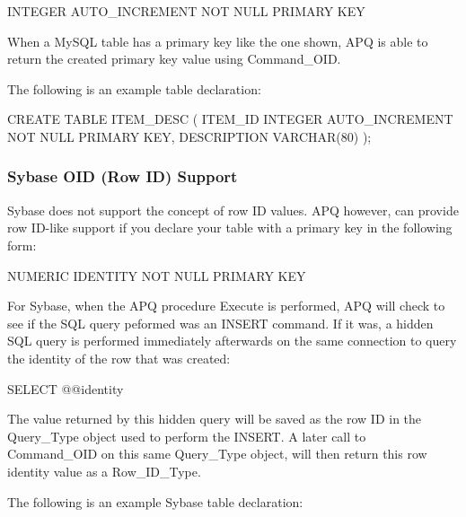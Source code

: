 \documentclass[english,letterpaper]{book}
\begin{document}
\begin{SQL}

   INTEGER AUTO_INCREMENT NOT NULL PRIMARY KEY

\end{SQL}

When a MySQL table has a primary key like the one shown, APQ is able
to return the created primary key value using Command\_OID. 

The following is an example table declaration:

\begin{SQL}
CREATE TABLE ITEM_DESC (
   ITEM_ID     INTEGER AUTO_INCREMENT NOT NULL PRIMARY KEY,
   DESCRIPTION VARCHAR(80)
);
\end{SQL}

\subsubsection{Sybase OID (Row ID) Support}

Sybase does not support the concept of row ID values. APQ however,
can provide row ID-like support if you declare your table with a primary
key in the following form:

\begin{SQL}

   NUMERIC IDENTITY NOT NULL PRIMARY KEY

\end{SQL}

For Sybase, when the APQ procedure Execute is performed, APQ will
check to see if the SQL query peformed was an INSERT command. If it
was, a hidden SQL query is performed immediately afterwards on the
same connection to query the identity of the row that was created:

\begin{SQL}

   SELECT @@identity

\end{SQL}

The value returned by this hidden query will be saved as the row ID
in the Query\-\_Type object used to perform the INSERT. A later call
to Command\_OID on this same Query\_Type object, will then return
this row identity value as a Row\_ID\_Type.

The following is an example Sybase table declaration:
\end{document}
